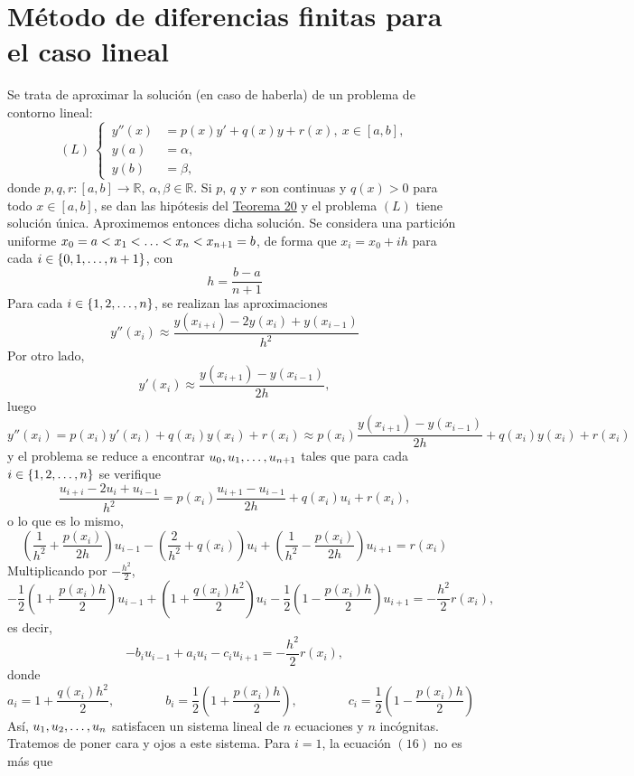 \documentclass[11pt]{report}
\theoremstyle{mytheorem}
\theoremstyle{mydefinition}
\theoremstyle{myexample}
\newcommand{\R}{\mathbb R}
\begin{document}
\section{Método de diferencias finitas para el caso lineal}

Se trata de aproximar la solución (en caso de haberla) de un problema de contorno lineal:
\[(L) \ \left\{
\begin{alignedat}{1}
\, y''(x)  &= p(x)y'+q(x)y+r(x), \ x \in [a,b], \\
\, y(a) &= \alpha, \\
\, y(b) &= \beta,
\end{alignedat}\right.\]
donde $p,q,r \colon [a,b] \to \R$, $\alpha,\beta \in \R$. Si $p$, $q$ y $r$ son continuas y $q(x) >0$ para todo $x \in [a,b]$, se dan las hipótesis del \hyperref[teo20]{\color{gray}Teorema 20} y el problema $(L)$ tiene solución única. Aproximemos entonces dicha solución. Se considera una partición uniforme $x_0=a<x_1<\mathellipsis<x_n<x_{n+1}=b$, de forma que $x_i=x_0+ih$ para cada $i \in \{0,1,\mathellipsis,n+1\}$, con \[h = \frac{b-a}{n+1}\] Para cada $i \in \{1,2,\mathellipsis,n\}$, se realizan las aproximaciones
\[y''(x_i) \approx \frac{y(x_{i+i})-2y(x_i)+y(x_{i-1})}{h^2}\]
Por otro lado, 
\[y'(x_i) \approx \frac{y(x_{i+1})-y(x_{i-1})}{2h},\]
luego
\[y''(x_i) = p(x_i)y'(x_i)+q(x_i)y(x_i)+r(x_i) \approx p(x_i)\frac{y(x_{i+1})-y(x_{i-1})}{2h}+q(x_i)y(x_i)+r(x_i)\]
y el problema se reduce a encontrar $u_0,u_1,\mathellipsis,u_{n+1}$ tales que para cada $i \in \{1,2,\mathellipsis,n\}$ se verifique
\[\frac{u_{i+i}-2u_i+u_{i-1}}{h^2} = p(x_i) \frac{u_{i+1}-u_{i-1}}{2h}+q(x_i)u_i+r(x_i),\]
o lo que es lo mismo,
\begin{equation}\left(\frac{1}{h^2}+\frac{p(x_i)}{2h}\right)u_{i-1} - \left(\frac{2}{h^2}+q(x_i)\right)u_i + \left(\frac{1}{h^2}-\frac{p(x_i)}{2h}\right)u_{i+1} = r(x_i)\end{equation}
Multiplicando por $-\frac{h^2}{2}$,
\[-\frac{1}{2}\left(1+\frac{p(x_i)h}{2} \right)u_{i-1}+\left(1+\frac{q(x_i)h^2}{2} \right)u_i-\frac{1}{2}\left( 1-\frac{p(x_i)h}{2}\right)u_{i+1} = -\frac{h^2}{2}r(x_i),\]
es decir,
\begin{equation}-b_iu_{i-1}+a_iu_i-c_iu_{i+1} = -\frac{h^2}{2}r(x_i),\end{equation}
donde
\[a_i = 1+\frac{q(x_i)h^2}{2}, \qquad \qquad b_i = \frac{1}{2}\left(1+\frac{p(x_i)h}{2} \right), \qquad \qquad c_i = \frac{1}{2}\left( 1-\frac{p(x_i)h}{2}\right)\]
Así, $u_1,u_2,\mathellipsis,u_n$ satisfacen un sistema lineal de $n$ ecuaciones y $n$ incógnitas. Tratemos de poner cara y ojos a este sistema. Para $i = 1$, la ecuación $(16)$ no es más que
\end{document}

